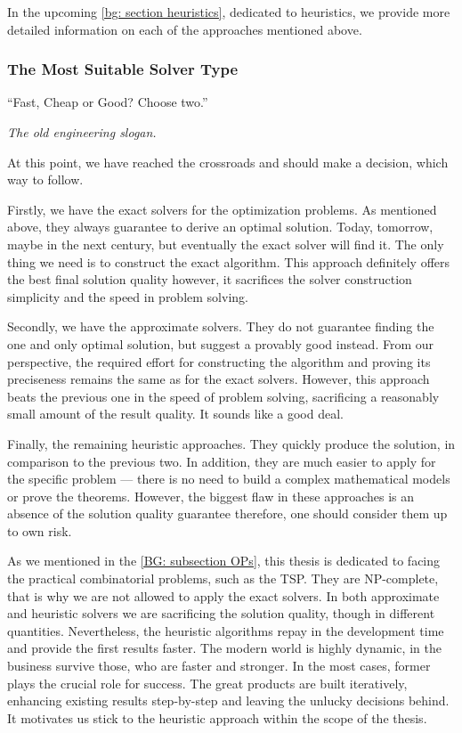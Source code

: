 In the upcoming \cref{bg: section heuristics}, dedicated to heuristics, we provide more detailed information on each of the approaches mentioned above.


\subsubsection{The Most Suitable Solver Type}
\epigraph{``Fast, Cheap or Good? Choose two.''}{\textit{The old engineering slogan.}}

At this point, we have reached the crossroads and should make a decision, which way to follow.

Firstly, we have the exact solvers for the optimization problems. As mentioned above, they always guarantee to derive an optimal solution. Today, tomorrow, maybe in the next century, but eventually the exact solver will find it. The only thing we need is to construct the exact algorithm. This approach definitely offers the best final solution quality however, it sacrifices the solver construction simplicity and the speed in problem solving.

Secondly, we have the approximate solvers. They do not guarantee finding the one and only optimal solution, but suggest a provably good instead. From our perspective, the required effort for constructing the algorithm and proving its preciseness remains the same as for the exact solvers. However, this approach beats the previous one in the speed of problem solving, sacrificing a reasonably small amount of the result quality. It sounds like a good deal.

Finally, the remaining heuristic approaches. They quickly produce the solution, in comparison to the previous two. In addition, they are much easier to apply for the specific problem — there is no need to build a complex mathematical models or prove the theorems. However, the biggest flaw in these approaches is an absence of the solution quality guarantee therefore, one should consider them up to own risk.

As we mentioned in the \cref{BG: subsection OPs}, this thesis is dedicated to facing the practical combinatorial problems, such as the TSP. They are NP-complete, that is why we are not allowed to apply the exact solvers. In both approximate and heuristic solvers we are sacrificing the solution quality, though in different quantities. Nevertheless, the heuristic algorithms repay in the development time and provide the first results faster. The modern world is highly dynamic, in the business survive those, who are faster and stronger. In the most cases, former plays the crucial role for success. The great products are built iteratively, enhancing existing results step-by-step and leaving the unlucky decisions behind. It motivates us stick to the heuristic approach within the scope of the thesis.

